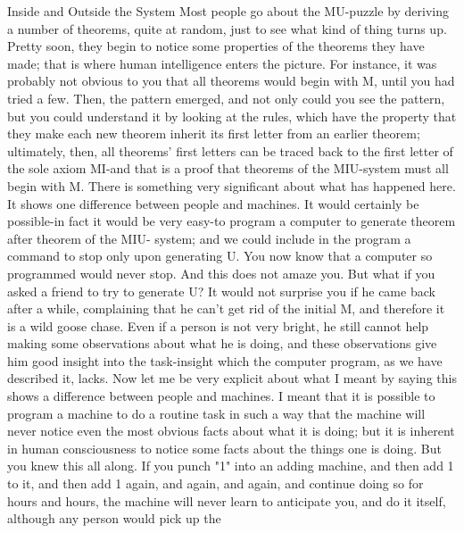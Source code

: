 Inside and Outside the System Most people go about the MU-puzzle by deriving a number of theorems, quite at random, just to see what kind of thing turns up. Pretty soon, they begin to notice some properties of the theorems they have made; that is where human intelligence enters the picture. For instance, it was probably not obvious to you that all theorems would begin with M, until you had tried a few. Then, the pattern emerged, and not only could you see the pattern, but you could understand it by looking at the rules, which have the property that they make each new theorem inherit its first letter from an earlier theorem; ultimately, then, all theorems' first letters can be traced back to the first letter of the sole axiom MI-and that is a proof that theorems of the MIU-system must all begin with M. There is something very significant about what has happened here. It shows one difference between people and machines. It would certainly be possible-in fact it would be very easy-to program a computer to generate theorem after theorem of the MIU- system; and we could include in the program a command to stop only upon generating U. You now know that a computer so programmed would never stop. And this does not amaze you. But what if you asked a friend to try to generate U? It would not surprise you if he came back after a while, complaining that he can't get rid of the initial M, and therefore it is a wild goose chase. Even if a person is not very bright, he still cannot help making some observations about what he is doing, and these observations give him good insight into the task-insight which the computer program, as we have described it, lacks. Now let me be very explicit about what I meant by saying this shows a difference between people and machines. I meant that it is possible to program a machine to do a routine task in such a way that the machine will never notice even the most obvious facts about what it is doing; but it is inherent in human consciousness to notice some facts about the things one is doing. But you knew this all along. If you punch "1" into an adding machine, and then add 1 to it, and then add 1 again, and again, and again, and continue doing so for hours and hours, the machine will never learn to anticipate you, and do it itself, although any person would pick up the 







